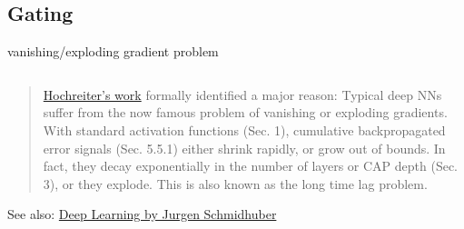 \documentclass[aspectratio=169,xcolor={dvipsnames,svgnames}]{beamer}
\begin{document}
\subsection{Gating}
\label{sec:org90b68e2}
\begin{frame}[label={sec:vanishing-exploding-gradient-problem}]{vanishing/exploding gradient problem}
\begin{columns}
\begin{column}{0.7\columnwidth}
\begin{quote}
\href{https://doi.org/10.1109/9780470544037.ch14}{Hochreiter's work} formally identified a major reason:
Typical deep NNs suffer from the now famous problem of
vanishing or exploding gradients. With standard
activation functions (Sec. 1), cumulative
backpropagated error signals (Sec. 5.5.1) either shrink
rapidly, or grow out of bounds. In fact, they decay
\alert{exponentially} in the number of layers or CAP depth
(Sec. 3), or they explode. This is also known as the
long time lag problem.
\end{quote}
\alert{See also:} \href{https://arxiv.org/abs/1404.7828}{Deep Learning by Jurgen Schmidhuber}
\end{column}
\end{columns}
\end{frame}
\end{document}
